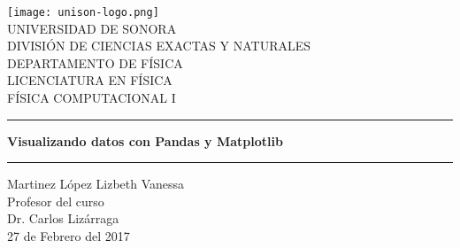\documentclass[12pt]{article}
\begin{document}
\begin{center}
\texttt{[image: unison-logo.png]}
\\
\vspace{0.5cm}
UNIVERSIDAD DE SONORA \\
\vspace{0.5cm}
DIVISIÓN DE CIENCIAS EXACTAS Y NATURALES \\
\vspace{0.5cm}
DEPARTAMENTO DE FÍSICA\\
\vspace{0.5cm}
LICENCIATURA EN FÍSICA\\
\vspace{0.5cm}
FÍSICA COMPUTACIONAL I

\vspace{2 cm}
\hrule
\vspace{1 cm}

{\huge \bfseries {Visualizando datos con Pandas y Matplotlib}}

\vspace{1 cm}
\hrule
\vspace{2 cm}
Martinez López Lizbeth Vanessa \\ 
\vspace{1 cm}
Profesor del curso\\
Dr. Carlos Lizárraga\\
\vspace{2 cm}
27 de Febrero del 2017
\end{center}
\pagebreak
\end{document}
